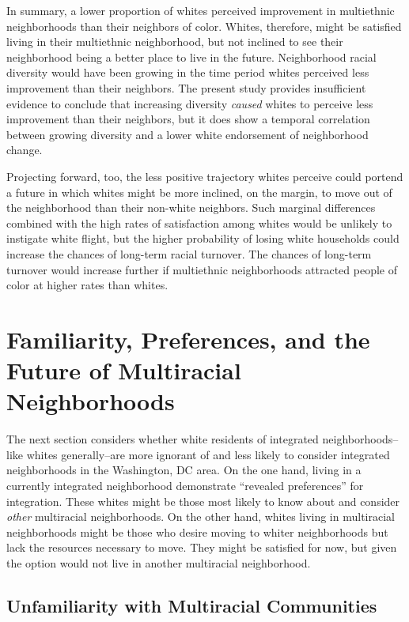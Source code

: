 \documentclass{baderart}
\begin{document}
In summary, a lower proportion of whites perceived improvement in multiethnic neighborhoods than their neighbors of color. Whites, therefore, might be satisfied living in their multiethnic neighborhood, but not inclined to see their neighborhood being a better place to live in the future. Neighborhood racial diversity would have been growing in the time period whites perceived less improvement than their neighbors. The present study provides insufficient evidence to conclude that increasing diversity \emph{caused} whites to perceive less improvement than their neighbors, but it does show a temporal correlation between growing diversity and a lower white endorsement of neighborhood change.

Projecting forward, too, the less positive trajectory whites perceive could portend a future in which whites might be more inclined, on the margin, to move out of the neighborhood than their non-white neighbors. Such marginal differences combined with the high rates of satisfaction among whites would be unlikely to instigate white flight, but the higher probability of losing white households could increase the chances of long-term racial turnover. The chances of long-term turnover would increase further if multiethnic neighborhoods attracted people of color at higher rates than whites.

\section{Familiarity, Preferences, and the Future of Multiracial Neighborhoods}

The next section considers whether white residents of integrated neighborhoods--like whites generally--are more ignorant of and less likely to consider integrated neighborhoods in the Washington, DC area. On the one hand, living in a currently integrated neighborhood demonstrate ``revealed preferences'' for integration. These whites might be those most likely to know about and consider \emph{other} multiracial neighborhoods. On the other hand, whites living in multiracial neighborhoods might be those who desire moving to whiter neighborhoods but lack the resources necessary to move. They might be satisfied for now, but given the option would not live in another multiracial neighborhood.

\subsection{Unfamiliarity with Multiracial Communities}\label{unfamiliarity-with-multiracial-communities}
\end{document}
